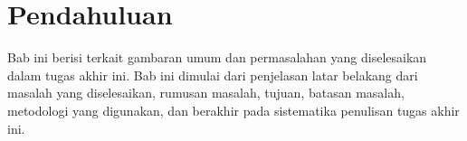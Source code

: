 \chapter{Pendahuluan}

Bab ini berisi terkait gambaran umum dan permasalahan yang  diselesaikan dalam tugas akhir ini. Bab ini  dimulai dari penjelasan latar belakang dari masalah yang diselesaikan, rumusan masalah, tujuan, batasan masalah, metodologi yang digunakan, dan berakhir pada sistematika penulisan tugas akhir ini.







